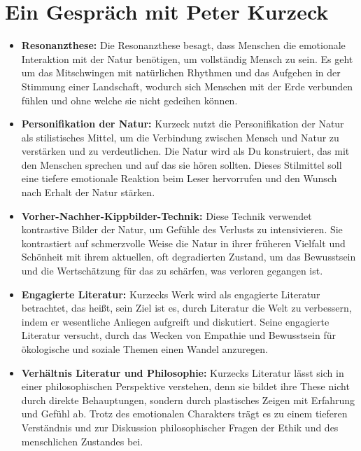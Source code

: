 \documentclass{article}
\begin{document}
\section{Ein Gespräch mit Peter Kurzeck}

\begin{itemize}
	\item \textbf{Resonanzthese:}
	      Die Resonanzthese besagt, dass Menschen die emotionale Interaktion mit der Natur benötigen, um vollständig Mensch zu sein. Es geht um das Mitschwingen mit natürlichen Rhythmen und das Aufgehen in der Stimmung einer Landschaft, wodurch sich Menschen mit der Erde verbunden fühlen und ohne welche sie nicht gedeihen können.

	\item \textbf{Personifikation der Natur:}
	      Kurzeck nutzt die Personifikation der Natur als stilistisches Mittel, um die Verbindung zwischen Mensch und Natur zu verstärken und zu verdeutlichen. Die Natur wird als Du konstruiert, das mit den Menschen sprechen und auf das sie hören sollten. Dieses Stilmittel soll eine tiefere emotionale Reaktion beim Leser hervorrufen und den Wunsch nach Erhalt der Natur stärken.

	\item \textbf{Vorher-Nachher-Kippbilder-Technik:}
	      Diese Technik verwendet kontrastive Bilder der Natur, um Gefühle des Verlusts zu intensivieren. Sie kontrastiert auf schmerzvolle Weise die Natur in ihrer früheren Vielfalt und Schönheit mit ihrem aktuellen, oft degradierten Zustand, um das Bewusstsein und die Wertschätzung für das zu schärfen, was verloren gegangen ist.

	\item \textbf{Engagierte Literatur:}
	      Kurzecks Werk wird als engagierte Literatur betrachtet, das heißt, sein Ziel ist es, durch Literatur die Welt zu verbessern, indem er wesentliche Anliegen aufgreift und diskutiert. Seine engagierte Literatur versucht, durch das Wecken von Empathie und Bewusstsein für ökologische und soziale Themen einen Wandel anzuregen.

	\item \textbf{Verhältnis Literatur und Philosophie:}
	      Kurzecks Literatur lässt sich in einer philosophischen Perspektive verstehen, denn sie bildet ihre These nicht durch direkte Behauptungen, sondern durch plastisches Zeigen mit Erfahrung und Gefühl ab. Trotz des emotionalen Charakters trägt es zu einem tieferen Verständnis und zur Diskussion philosophischer Fragen der Ethik und des menschlichen Zustandes bei.
\end{itemize}
\end{document}
